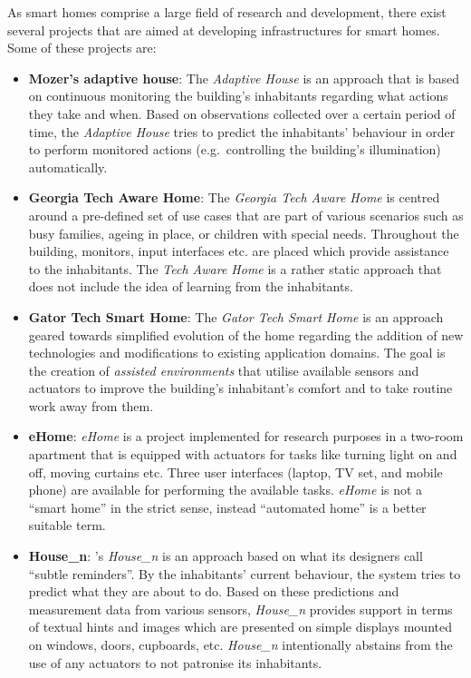 As smart homes comprise a large field of research and development, there exist several projects that are aimed at developing infrastructures for smart homes. Some of these projects are:
\begin{itemize}
  \item \textbf{Mozer's adaptive house}: The \emph{Adaptive House} is an approach that is based on continuous monitoring the building's inhabitants regarding what actions they take and when. Based on observations collected over a certain period of time, the \emph{Adaptive House} tries to predict the inhabitants' behaviour in order to perform monitored actions (e.g.\ controlling the building's illumination) automatically.~\cite{adaptivehouse}
  \item \textbf{Georgia Tech Aware Home}: The \emph{Georgia Tech Aware Home} is centred around a pre-defined set of use cases that are part of various scenarios such as busy families, ageing in place, or children with special needs. Throughout the building, monitors, input interfaces etc. are placed which provide assistance to the inhabitants. The \emph{Tech Aware Home} is a rather static approach that does not include the idea of learning from the inhabitants.~\cite{techawarehome}
  \item \textbf{Gator Tech Smart Home}: The \emph{Gator Tech Smart Home} is an approach geared towards simplified evolution of the home regarding the addition of new technologies and modifications to existing application domains. The goal is the creation of \emph{assisted environments} that utilise available sensors and actuators to improve the building's inhabitant's comfort and to take routine work away from them.~\cite{gator_tech}
  \item \textbf{eHome}: \emph{eHome} is a project implemented for research purposes in a two-room apartment that is equipped with actuators for tasks like turning light on and off, moving curtains etc. Three user interfaces (laptop, TV set, and mobile phone) are available for performing the available tasks. \emph{eHome} is not a ``smart home'' in the strict sense, instead ``automated home'' is a better suitable term.~\cite{ehome}
  \item \textbf{House\_n}: 's \emph{House\_n} is an approach based on what its designers call ``subtle reminders''. By the inhabitants' current behaviour, the system tries to predict what they are about to do. Based on these predictions and measurement data from various sensors, \emph{House\_n} provides support in terms of textual hints and images which are presented on simple displays mounted on windows, doors, cupboards, etc. \emph{House\_n} intentionally abstains from the use of any actuators to not patronise its inhabitants.~\cite{housen}
\end{itemize}

